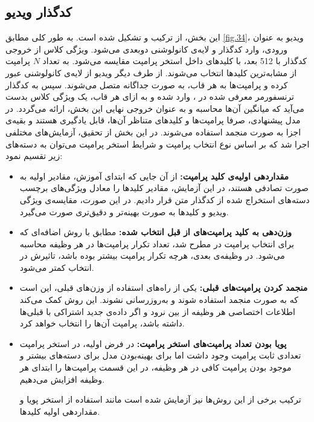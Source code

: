 \subsection{کدگذار ویدیو}
این بخش، از ترکیب  و  تشکیل شده است. به طور کلی مطابق \cref{fig.34}، ویدیو به عنوان ورودی، وارد کدگذار  و لایه‌ی کانولوشنی دو‌بعدی می‌شود. ویژگی کلاس  از خروجی کدگذار  با 512 بعد، با کلیدهای داخل استخر پرامپت مقایسه می‌شود. به تعداد $N$ پرامپت از مشابه‌ترین کلیدها انتخاب می‌شوند. از طرف دیگر ویدیو از لایه‌ی کانولوشنی عبور کرده و پرامپت‌ها به هر قاب، به صورت جداگانه متصل می‌شوند. سپس به کدگذار ترنسفورمر معرفی شده در ، وارد شده و به ازای هر قاب، یک ویژگی کلاس بدست می‌آید که میانگین آن‌ها محاسبه و به عنوان خروجی نهایی این بخش، ارائه می‌گردد. در مدل پیشنهادی، صرفا پرامپت‌ها و کلیدهای متناظر آن‌ها، قابل یادگیری هستند و بقیه‌ی اجزا به صورت منجمد استفاده می‌شوند. در این بخش از تحقیق، آزمایش‌های مختلفی اجرا شد که بر اساس نوع انتخاب پرامپت و شرایط استخر پرامپت می‌توان به دسته‌‌های زیر تقسیم نمود:
\begin{itemize}
\item \textbf{مقداردهی اولیه‌ی کلید پرامپت:}
از آن جایی که ابتدای آموزش، مقادیر اولیه به صورت تصادفی هستند، در این آزمایش، مقادیر کلیدها را معادل ویژگی‌های برچسب دسته‌های استخراج شده از کدگذار متن قرار دادیم. در این صورت، مقایسه‌ی ویژگی ویدیو و کلیدها به صورت بهینه‌تر و دقیق‌تری صورت می‌گیرد. 
\item \textbf{وزن‌دهی به کلید پرامپت‌های از قبل انتخاب شده:}
مطابق با روش اضافه‌ای که برای انتخاب پرامپت در  مطرح شد، تعداد تکرار پرامپت‌ها در هر وظیفه محاسبه می‌شود. در وظیفه‌ی بعدی، هرچه تکرار پرامپت بیشتر بوده باشد، تاثیرش در انتخاب کمتر می‌شود. 
\item \textbf{منجمد کردن پرامپت‌های قبلی:}
یکی از راه‌های استفاده از وزن‌های قبلی، این است که به صورت منجمد استفاده شوند و به‌روزرسانی نشوند. این روش کمک می‌کند اطلاعات اختصاصی هر وظیفه از بین نرود و اگر داده‌ی جدید اشتراکی با قبلی‌ها داشته باشد، پرامپت آن‌ها را انتخاب خواهد کرد.
\item \textbf{پویا بودن تعداد پرامپت‌های استخر پرامپت:}
در فرض اولیه، در استخر پرامپت تعدادی ثابت پرامپت وجود داشت اما برای بهینه‌بودن مدل برای دسته‌های بیشتر و موجود بودن پرامپت کافی در هر وظیفه، در این قسمت پرامپت‌ها را ابتدای هر وظیفه افزایش می‌دهیم. 

ترکیب برخی از این روش‌ها نیز آزمایش شده است مانند استفاده از استخر پویا و مقداردهی اولیه کلیدها.  
\end{itemize}
